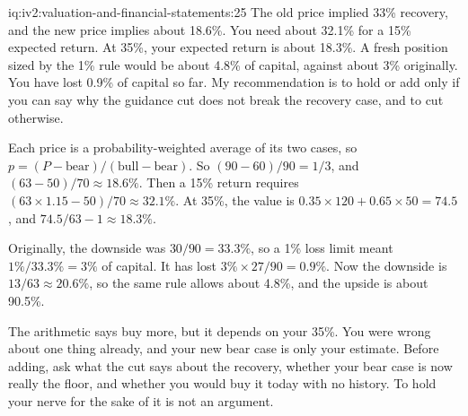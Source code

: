 \begin{solution}{iq:iv2:valuation-and-financial-statements:25}
The old price implied 33\% recovery, and the new price implies about 18.6\%. You need about 32.1\% for a 15\% expected return. At 35\%, your expected return is about 18.3\%. A fresh position sized by the 1\% rule would be about 4.8\% of capital, against about 3\% originally. You have lost 0.9\% of capital so far. My recommendation is to hold or add only if you can say why the guidance cut does not break the recovery case, and to cut otherwise.

Each price is a probability-weighted average of its two cases, so $p = (P - \text{bear})/(\text{bull} - \text{bear})$. So $(90 - 60)/90 = 1/3$, and $(63 - 50)/70 \approx 18.6\%$. Then a 15\% return requires $(63 \times 1.15 - 50)/70 \approx 32.1\%$. At 35\%, the value is $0.35 \times 120 + 0.65 \times 50 = 74.5$, and $74.5/63 - 1 \approx 18.3\%$.

Originally, the downside was $30/90 = 33.3\%$, so a 1\% loss limit meant $1\%/33.3\% = 3\%$ of capital. It has lost $3\% \times 27/90 = 0.9\%$. Now the downside is $13/63 \approx 20.6\%$, so the same rule allows about 4.8\%, and the upside is about 90.5\%.

The arithmetic says buy more, but it depends on your 35\%. You were wrong about one thing already, and your new bear case is only your estimate. Before adding, ask what the cut says about the recovery, whether your bear case is now really the floor, and whether you would buy it today with no history. To hold your nerve for the sake of it is not an argument.

\end{solution}
